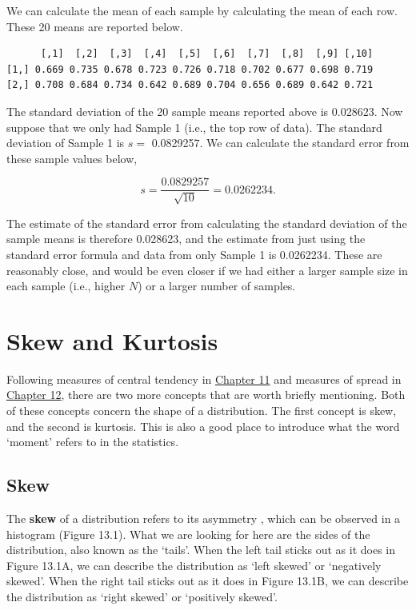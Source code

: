 \documentclass[
]{scrbook}
\begin{document}
We can calculate the mean of each sample by calculating the mean of each row.
These 20 means are reported below.

\begin{verbatim}
      [,1]  [,2]  [,3]  [,4]  [,5]  [,6]  [,7]  [,8]  [,9] [,10]
[1,] 0.669 0.735 0.678 0.723 0.726 0.718 0.702 0.677 0.698 0.719
[2,] 0.708 0.684 0.734 0.642 0.689 0.704 0.656 0.689 0.642 0.721
\end{verbatim}

The standard deviation of the 20 sample means reported above is 0.028623.
Now suppose that we only had Sample 1 (i.e., the top row of data).
The standard deviation of Sample 1 is \(s =\) 0.0829257.
We can calculate the standard error from these sample values below,

\[s = \frac{0.0829257}{\sqrt{10}} = 0.0262234.\]

The estimate of the standard error from calculating the standard deviation of the sample means is therefore 0.028623, and the estimate from just using the standard error formula and data from only Sample 1 is 0.0262234.
These are reasonably close, and would be even closer if we had either a larger sample size in each sample (i.e., higher \(N\)) or a larger number of samples.

\hypertarget{skew-and-kurtosis}{%
\chapter{Skew and Kurtosis}\label{skew-and-kurtosis}}

Following measures of central tendency in \protect\hyperlink{Chapter_11}{Chapter 11} and measures of spread in \protect\hyperlink{Chapter_12}{Chapter 12}, there are two more concepts that are worth briefly mentioning.
Both of these concepts concern the shape of a distribution.
The first concept is skew, and the second is kurtosis.
This is also a good place to introduce what the word `moment' refers to in the statistics.

\hypertarget{skew}{%
\section{Skew}\label{skew}}

The \textbf{skew} of a distribution refers to its asymmetry \citep{Sokal1995, Dytham2011}, which can be observed in a histogram (Figure 13.1).
What we are looking for here are the sides of the distribution, also known as the `tails'.
When the left tail sticks out as it does in Figure 13.1A, we can describe the distribution as `left skewed' or `negatively skewed'.
When the right tail sticks out as it does in Figure 13.1B, we can describe the distribution as `right skewed' or `positively skewed'.
\end{document}
